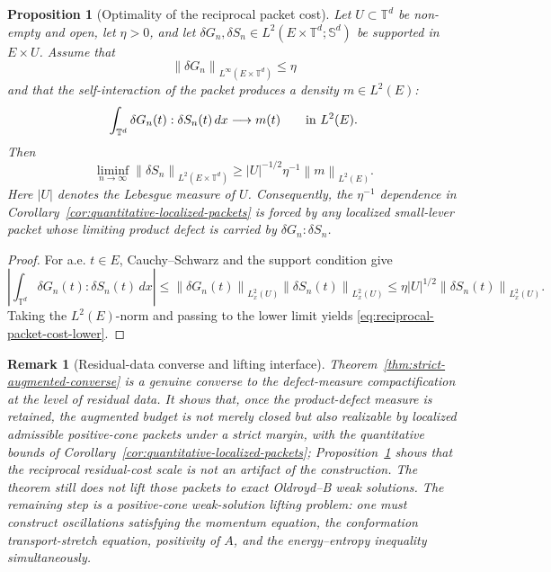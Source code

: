 \documentclass[11pt]{article}
\numberwithin{equation}{section}
\newtheorem{proposition}[theorem]{Proposition}
\newtheorem{remark}[theorem]{Remark}
\newcommand{\T}{\mathbb T}
\newcommand{\Sym}{\mathbb S}
\newcommand{\norm}[1]{\left\lVert #1\right\rVert}
\begin{document}
\begin{proposition}[Optimality of the reciprocal packet cost]
\label{prop:reciprocal-packet-cost}
Let \(U\subset\T^d\) be non-empty and open, let \(\eta>0\), and let
\(\delta G_n,\delta S_n\in L^2(E\times\T^d;\Sym^d)\) be supported in
\(E\times U\).  Assume that
\[
  \norm{\delta G_n}_{L^\infty(E\times\T^d)}\le\eta
\]
and that the self-interaction of the packet produces a density \(m\in L^2(E)\):
\[
  \int_{\T^d}\delta G_n(t):\delta S_n(t)\,dx
  \longrightarrow m(t)
  \qquad\hbox{in }L^2(E).
\]
Then
\begin{equation}
  \liminf_{n\to\infty}
  \norm{\delta S_n}_{L^2(E\times\T^d)}
  \ge
  |U|^{-1/2}\eta^{-1}\norm{m}_{L^2(E)} .
  \label{eq:reciprocal-packet-cost-lower}
\end{equation}
Here \(|U|\) denotes the Lebesgue measure of \(U\).  Consequently, the
\(\eta^{-1}\) dependence in
Corollary~\ref{cor:quantitative-localized-packets} is forced by any localized
small-lever packet whose limiting product defect is carried by
\(\delta G_n:\delta S_n\).
\end{proposition}

\begin{proof}
For a.e. \(t\in E\), Cauchy--Schwarz and the support condition give
\[
  \left|\int_{\T^d}\delta G_n(t):\delta S_n(t)\,dx\right|
  \le
  \norm{\delta G_n(t)}_{L^2_x(U)}
  \norm{\delta S_n(t)}_{L^2_x(U)}
  \le
  \eta |U|^{1/2}\norm{\delta S_n(t)}_{L^2_x(U)} .
\]
Taking the \(L^2(E)\)-norm and passing to the lower limit yields
\eqref{eq:reciprocal-packet-cost-lower}.
\end{proof}

\begin{remark}[Residual-data converse and lifting interface]
Theorem~\ref{thm:strict-augmented-converse} is a genuine converse to the
defect-measure compactification at the level of residual data.  It shows that,
once the product-defect measure is retained, the augmented budget is not merely
closed but also realizable by localized admissible positive-cone packets under
a strict margin, with the quantitative bounds of
Corollary~\ref{cor:quantitative-localized-packets}; Proposition~\ref{prop:reciprocal-packet-cost}
shows that the reciprocal residual-cost scale is not an artifact of the
construction.  The theorem still does not lift those packets to exact
Oldroyd--B weak solutions.  The remaining step is a positive-cone
weak-solution lifting problem: one must construct oscillations satisfying the
momentum equation, the conformation transport-stretch equation, positivity of
\(A\), and the energy--entropy inequality simultaneously.
\end{remark}
\end{document}
